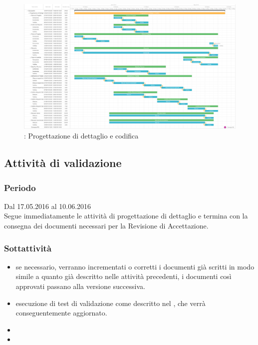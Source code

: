 \documentclass[a4paper, titlepage]{article}
\begin{document}
\newpage
\begin{figure}[!ht]
	\includegraphics[scale=0.25]{Img/Grafici_Gantt/Progettazione(dett-cod).pdf}
	\caption{ : Progettazione di dettaglio e codifica}
\end{figure}

\subsection{Attività di validazione}
\subsubsection{Periodo}
Dal 17.05.2016 al 10.06.2016\\
Segue immediatamente le attività di progettazione di dettaglio  e termina con la consegna dei documenti necessari per la Revisione di Accettazione.

\subsubsection{Sottattività}
\begin{itemize}
	\item {} se necessario, verranno incrementati o corretti i documenti già scritti in modo simile a quanto già descritto nelle attività precedenti, i documenti così approvati passano alla versione successiva.
	\item {} esecuzione di test di validazione come descritto nel , che verrà conseguentemente aggiornato.
	\item {} 
	\item {} 
\end{itemize}
\end{document}
